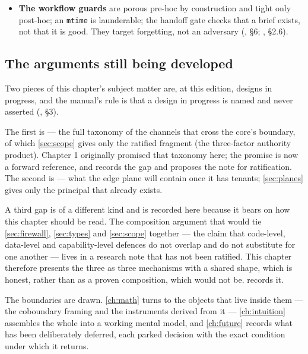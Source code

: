 \begin{itemize}[leftmargin=*]
    built module states that it wires no enforcement into any read path
    (). Its tier is per-inhabitant: two of
    the five built views are \tstruct{}, three are \tstatic{} and are labelled so
    (, \S 2.4). Its time component is honestly
    partial: cross-clock meets raise rather than guess.
  \item \textbf{The workflow guards} are porous pre-hoc by construction and tight
    only post-hoc; an \texttt{mtime} is launderable; the handoff gate checks that
    a brief exists, not that it is good. They target forgetting, not an adversary
    (, \S 6; ,
    \S 2.6).
\end{itemize}

\subsection*{The arguments still being developed}

Two pieces of this chapter's subject matter are, at this edition, designs in
progress, and the manual's rule is that a design in progress is named and never
asserted (, \S 3).

The first is  --- the full taxonomy
of the channels that cross the core's boundary, of which \autoref{sec:scope} gives
only the ratified fragment (the three-factor authority product). Chapter 1
originally promised that taxonomy here; the promise is now a forward reference, and
 records the gap and proposes the note for ratification.
The second is  --- what the edge plane
will contain once it has tenants; \autoref{sec:planes} gives only the principal
that already exists.

A third gap is of a different kind and is recorded here because it bears on how
this chapter should be read. The composition argument that would tie
\autoref{sec:firewall}, \autoref{sec:types} and \autoref{sec:scope} together ---
the claim that code-level, data-level and capability-level defences do not overlap
and do not substitute for one another --- lives in a research note that has not
been ratified. This chapter therefore presents the three as three mechanisms with a
shared shape, which is honest, rather than as a proven composition, which would not
be.  records it.

\bigskip

The boundaries are drawn. \autoref{ch:math} turns to the objects that live inside
them --- the coboundary framing and the instruments derived from it ---
\autoref{ch:intuition} assembles the whole into a working mental model, and
\autoref{ch:future} records what has been deliberately deferred, each parked
decision with the exact condition under which it returns.
